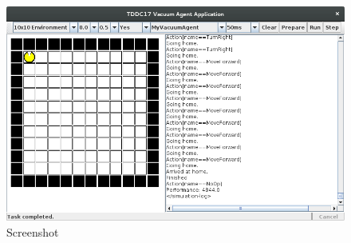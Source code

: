 \begin{figure}[h]
    \centering
      \includegraphics[width=0.83\linewidth]{./images/lab_1.png}
    \caption{Screenshot\label{Vacuum cleaner}}
\end{figure}

\thispagestyle{empty}
